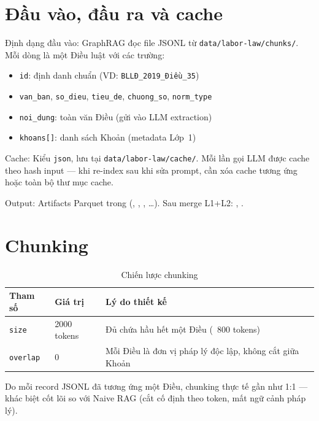 \documentclass[../DoAn.tex]{subfiles}
\begin{document}
\section{Đầu vào, đầu ra và cache}
\label{appendix:a-io}

Định dạng đầu vào: GraphRAG đọc file JSONL từ \texttt{data/labor-law/chunks/}. Mỗi dòng là một Điều luật với các trường:

\begin{itemize}[nosep, leftmargin=*]
    \item \texttt{id}: định danh chuẩn (VD: \texttt{BLLĐ\_2019\_Điều\_35})
    \item \texttt{van\_ban}, \texttt{so\_dieu}, \texttt{tieu\_de}, \texttt{chuong\_so}, \texttt{norm\_type}
    \item \texttt{noi\_dung}: toàn văn Điều (gửi vào LLM extraction)
    \item \texttt{khoans[]}: danh sách Khoản (metadata Lớp~1)
\end{itemize}

Cache: Kiểu \texttt{json}, lưu tại \texttt{data/labor-law/cache/}. Mỗi lần gọi LLM được cache theo hash input --- khi re-index sau khi sửa prompt, cần xóa cache tương ứng hoặc toàn bộ thư mục cache.

Output: Artifacts Parquet trong  (, , , \ldots). Sau merge L1+L2: , .

\section{Chunking}
\label{appendix:a-chunking}

\begin{table}[htbp]
\centering
\caption{Chiến lược chunking}
\label{table:chunking-config}
\small
\begin{tabular}{|l|l|p{6.8cm}|}
\hline
\textbf{Tham số} & \textbf{Giá trị} & \textbf{Lý do thiết kế} \\
\hline
\texttt{size} & 2000 tokens & Đủ chứa hầu hết một Điều (~800 tokens) \\
\texttt{overlap} & 0 & Mỗi Điều là đơn vị pháp lý độc lập, không cắt giữa Khoản \\
\hline
\end{tabular}
\end{table}

Do mỗi record JSONL đã tương ứng một Điều, chunking thực tế gần như 1:1 --- khác biệt cốt lõi so với Naive RAG (cắt cố định theo token, mất ngữ cảnh pháp lý).
\end{document}

